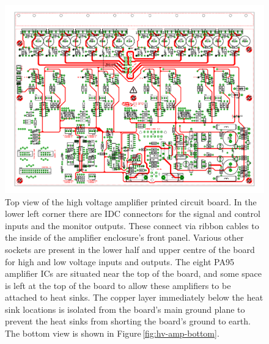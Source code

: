 \begin{figure}
  \centering
  \includegraphics[width=\columnwidth]{graphics/60-hv-amp-top.pdf}
  \caption[High voltage amplifier board layout (top)]{\label{fig:hv-amp-top}Top view of the high voltage amplifier printed circuit board. In the lower left corner there are IDC connectors for the signal and control inputs and the monitor outputs. These connect via ribbon cables to the inside of the amplifier enclosure's front panel. Various other sockets are present in the lower half and upper centre of the board for high and low voltage inputs and outputs. The eight PA95 amplifier ICs are situated near the top of the board, and some space is left at the top of the board to allow these amplifiers to be attached to heat sinks. The copper layer immediately below the heat sink locations is isolated from the board's main ground plane to prevent the heat sinks from shorting the board's ground to earth. The bottom view is shown in Figure\,\ref{fig:hv-amp-bottom}.}
\end{figure}

